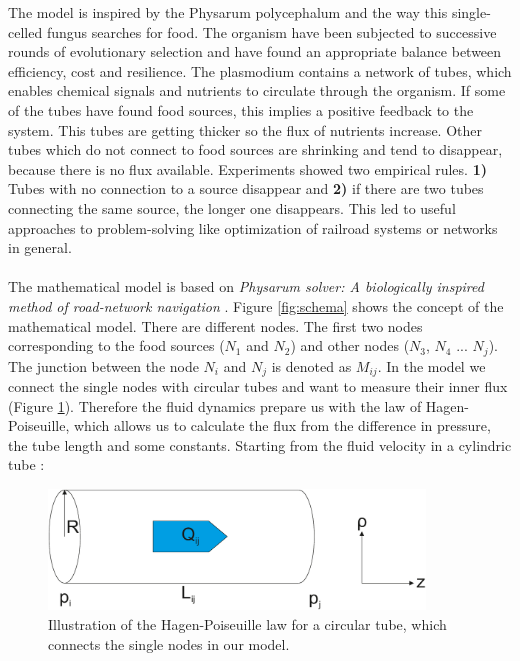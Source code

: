 \documentclass[11pt]{scrartcl}
\begin{document}
The model is inspired by the Physarum polycephalum and the way this single-celled fungus searches for food. The organism have been subjected to successive rounds of evolutionary selection and have found an appropriate balance between efficiency, cost and resilience. The plasmodium contains a network of tubes, which enables chemical signals and nutrients to circulate through the organism. If some of the tubes have found food sources, this implies a positive feedback to the system. This tubes are getting thicker so the flux of nutrients increase. Other tubes which do not connect to food sources are shrinking and tend to disappear, because there is no flux available. Experiments showed two empirical rules. \textbf{1)} Tubes with no connection to a source disappear and \textbf{2)} if there are two tubes connecting the same source, the longer one disappears. This led to useful approaches to problem-solving like optimization of railroad systems or networks in general.~\\
~\\
The mathematical model is based on \textit{Physarum solver: A biologically inspired method of road-network navigation} \cite{network_model}. Figure \ref{fig:schema} shows the concept of the mathematical model. There are different nodes. The first two nodes corresponding to the food sources ($N_1$ and $N_2$) and other nodes ($N_3$, $N_4$ ... $N_j$). The junction between the node $N_i$ and $N_j$ is denoted as $M_{ij}$. In the model we connect the single nodes with circular tubes and want to measure their inner flux (Figure \ref{fig:fluidd}). Therefore the fluid dynamics prepare us with the law of Hagen-Poiseuille, which allows us to calculate the flux from the difference in pressure, the tube length and some constants. Starting from the fluid velocity in a cylindric tube \cite{kirb2010}:
\begin{figure}[H]
	\centering
	\includegraphics[width=10cm]{figures/figure2}
	\caption{Illustration of the Hagen-Poiseuille law for a circular tube, which connects the single nodes in our model.}
	\label{fig:fluidd}
\end{figure}
\end{document}
